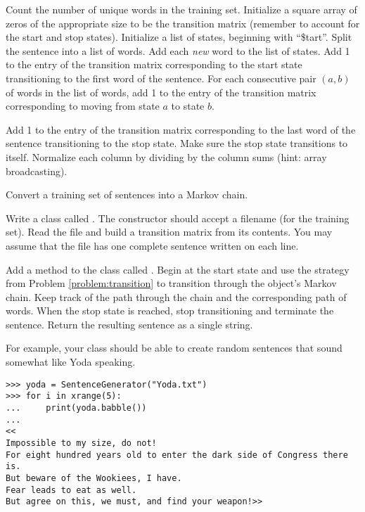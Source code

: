 \begin{algorithm} %
\begin{algorithmic}[1]
\State Count the number of unique words in the training set.
\State Initialize a square array of zeros of the appropriate size to be the transition matrix (remember to account for the start and stop states).
\State Initialize a list of states, beginning with ``\$tart''.
    \State Split the sentence into a list of words.
    \State Add each \emph{new} word to the list of states.
    \State Add 1 to the entry of the transition matrix corresponding to the start state transitioning to the first word of the sentence.
   	\State For each consecutive pair $(a, b)$ of words in the list of words, add 1 to the entry of the transition matrix corresponding to moving from state $a$ to state $b$.
	\item Add 1 to the entry of the transition matrix corresponding to the last word of the sentence transitioning to the stop state.
\EndFor
\State Make sure the stop state transitions to itself.
\State Normalize each column by dividing by the column sums (hint: array broadcasting).
\EndProcedure
\end{algorithmic}
\caption{Convert a training set of sentences into a Markov chain.}
\label{alg:MarkovSentencesTransitionMatrix}
\end{algorithm}

\begin{problem} %
Write a class called .
The constructor should accept a filename (for the training set).
Read the file and build a transition matrix from its contents.
You may assume that the file has one complete sentence written on each line.
\label{problem:MarkovClassPt1}
\end{problem}


\begin{problem} %
Add a method to the  class called .
Begin at the start state and use the strategy from Problem \ref{problem:transition} to transition through the object's Markov chain.
Keep track of the path through the chain and the corresponding path of words.
When the stop state is reached, stop transitioning and terminate the sentence.
Return the resulting sentence as a single string.

For example, your  class should be able to create random sentences that sound somewhat like Yoda speaking.
\begin{lstlisting}
>>> yoda = SentenceGenerator("Yoda.txt")
>>> for i in xrange(5):
... 	print(yoda.babble())
...
<<
Impossible to my size, do not!
For eight hundred years old to enter the dark side of Congress there is.
But beware of the Wookiees, I have.
Fear leads to eat as well.
But agree on this, we must, and find your weapon!>>
\end{lstlisting}
\end{problem}

